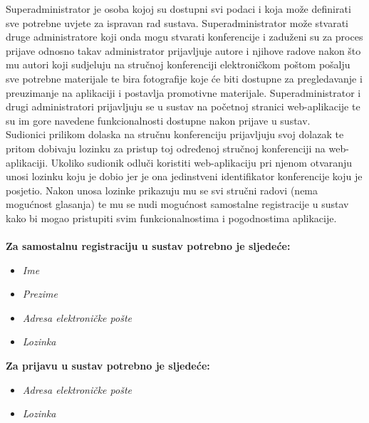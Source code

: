 Superadministrator je osoba kojoj su dostupni svi podaci i koja može definirati sve potrebne uvjete za ispravan rad sustava. Superadministrator može stvarati druge administratore koji onda mogu stvarati konferencije i zaduženi su za proces prijave odnosno takav administrator prijavljuje autore i njihove radove nakon što mu autori koji sudjeluju na stručnoj konferenciji elektroničkom poštom pošalju sve potrebne materijale te bira fotografije koje će biti dostupne za pregledavanje i preuzimanje na aplikaciji i postavlja promotivne materijale. Superadministrator i drugi administratori prijavljuju se u sustav na početnoj stranici web-aplikacije te su im gore navedene funkcionalnosti dostupne nakon prijave u sustav.\\		
		Sudionici prilikom dolaska na stručnu konferenciju prijavljuju svoj dolazak te pritom dobivaju lozinku za pristup toj određenoj stručnoj konferenciji na web-aplikaciji. Ukoliko sudionik odluči koristiti web-aplikaciju pri njenom otvaranju unosi lozinku koju je dobio jer je ona jedinstveni identifikator konferencije koju je posjetio. Nakon unosa lozinke prikazuju mu se svi stručni radovi (nema mogućnost glasanja) te mu se nudi mogućnost samostalne registracije u sustav kako bi mogao pristupiti svim funkcionalnostima i pogodnostima aplikacije.\\\\

        \textbf{Za samostalnu registraciju u sustav potrebno je sljedeće:}
        \begin{itemize}
        	\item \textit{Ime}
        	\item \textit{Prezime}
        	\item \textit{Adresa elektroničke pošte}
        	\item \textit{Lozinka}
        \end{itemize}

		\textbf{Za prijavu u sustav potrebno je sljedeće:}
        \begin{itemize}
            \item \textit{Adresa elektroničke pošte}
            \item \textit{Lozinka}
        \end{itemize}
        
